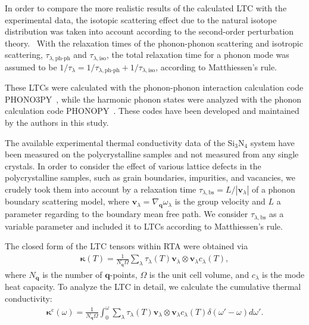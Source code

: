\documentclass[twocolumn,amsmath,amssymb,a4paper,prb,superscriptaddress,floatfix]{revtex4-1}
\begin{document}
In order to compare the more realistic results of the calculated LTC with the
experimental data, the isotopic scattering effect due to the natural isotope
distribution was taken into account according to the second-order perturbation
theory.~\cite{tamura} With the relaxation times of the phonon-phonon scattering
and isotropic scattering, $\tau_{\lambda,\text{ph-ph}}$ and
$\tau_{\lambda,\text{iso}}$, the total relaxation time for a phonon mode was
assumed to be $1/\tau_{\lambda} = 1/\tau_{\lambda,\text{ph-ph}} +
1/\tau_{\lambda,\text{iso}}$, according to Matthiessen's rule.

These LTCs were calculated with the phonon-phonon interaction calculation code
PHONO3PY~\cite{phono3py}, while the harmonic phonon states were analyzed with
the phonon calculation code PHONOPY~\cite{phonopy}. These codes have been
developed and maintained by the authors in this study.

The available experimental thermal conductivity data of the Si$_3$N$_4$ system
have been measured on the polycrystalline samples and not measured from any
single crystals. In order to consider the effect of various lattice defects in
the polycrystalline samples, such as grain boundaries, impurities, and
vacancies, we crudely took them into account by a relaxation time
$\tau_{\lambda,\text{bs}}=L/|\mathbf{v}_\lambda|$ of a phonon boundary
scattering model, where $\mathbf{v}_\lambda =
\nabla_{\mathbf{q}}\omega_\lambda$ is the group velocity and $L$ a
parameter regarding to the boundary mean free path. We consider
$\tau_{\lambda,\text{bs}}$ as a variable parameter and included it to
LTCs according to Matthiessen's rule.

The closed form of the LTC tensors within RTA were obtained via
\begin{align}
 \label{eq:kappa}
 \boldsymbol{\kappa}(T) = \frac{1}{N_\mathbf{q}\Omega} \sum_\lambda
 \tau_\lambda(T) \mathbf{v}_\lambda \otimes \mathbf{v}_\lambda c_\lambda(T),
\end{align}
where $N_\mathbf{q}$ is the number of
$\mathbf{q}$-points, $\Omega$ is the unit cell volume, and $c_\lambda$
is the mode heat capacity. To analyze the LTC in detail, we calculate
the cumulative thermal conductivity:
\begin{align}
 \label{eq:cum-kappa}
 \boldsymbol{\kappa}^\text{c}(\omega) = \frac{1}{N_\mathbf{q}\Omega}
 \int_0^\omega \sum_\lambda
 \tau_\lambda(T) \mathbf{v}_\lambda \otimes \mathbf{v}_\lambda
 c_\lambda(T) \delta(\omega'-\omega)d\omega'.
\end{align}
\end{document}
